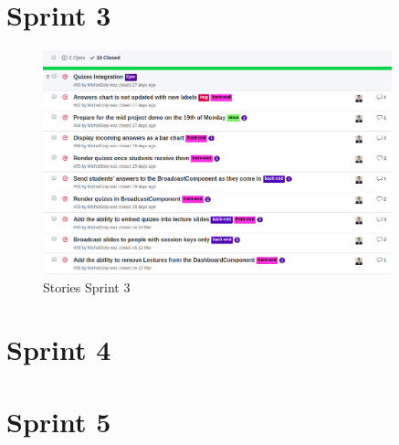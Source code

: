 \newpage
\section{Sprint 3}
\begin{figure}[ht]
    \centering
    \includegraphics[width=0.9\textwidth]{Appendix3/3.jpg}
    \caption{Stories Sprint 3}
    \label{fig:sprintstories3}
\end{figure}


\section{Sprint 4}
\section{Sprint 5}
